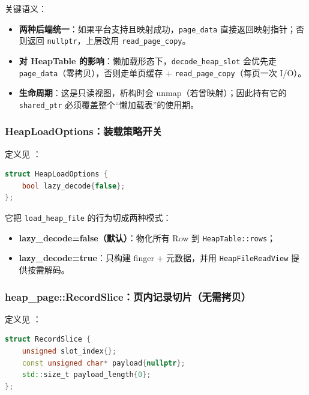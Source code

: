 关键语义：

\begin{itemize}
  \item \textbf{两种后端统一}：如果平台支持且映射成功，\texttt{page\_data} 直接返回映射指针；否则返回 \texttt{nullptr}，上层改用 \texttt{read\_page\_copy}。
  \item \textbf{对 HeapTable 的影响}：懒加载形态下，\texttt{decode\_heap\_slot} 会优先走 \texttt{page\_data}（零拷贝），否则走单页缓存 + \texttt{read\_page\_copy}（每页一次 I/O）。
  \item \textbf{生命周期}：这是只读视图，析构时会 unmap（若曾映射）；因此持有它的 \texttt{shared\_ptr} 必须覆盖整个“懒加载表”的使用期。
\end{itemize}

\subsubsection{HeapLoadOptions：装载策略开关}

定义见 ：

\begin{lstlisting}[language=C++,caption={HeapLoadOptions（原型）}]
struct HeapLoadOptions {
    bool lazy_decode{false};
};
\end{lstlisting}

它把 \texttt{load\_heap\_file} 的行为切成两种模式：

\begin{itemize}
  \item \textbf{lazy\_decode=false（默认）}：物化所有 Row 到 \texttt{HeapTable::rows}；
  \item \textbf{lazy\_decode=true}：只构建 finger + 元数据，并用 \texttt{HeapFileReadView} 提供按需解码。
\end{itemize}

\subsubsection{heap\_page::RecordSlice：页内记录切片（无需拷贝）}

定义见 ：

\begin{lstlisting}[language=C++,caption={RecordSlice（原型）}]
struct RecordSlice {
    unsigned slot_index{};
    const unsigned char* payload{nullptr};
    std::size_t payload_length{0};
};
\end{lstlisting}

